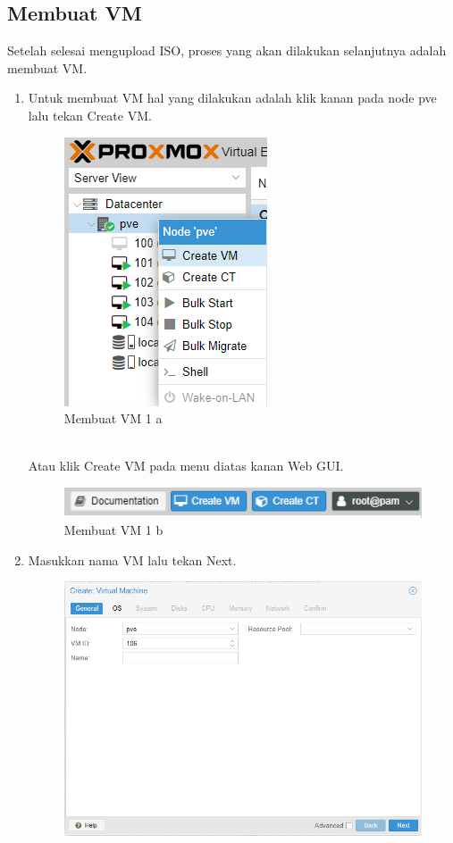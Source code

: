 \documentclass{article}
\begin{document}
  \subsection{Membuat VM}
  Setelah selesai mengupload ISO, proses yang akan dilakukan selanjutnya adalah membuat VM.
  \begin{enumerate}
  \item Untuk membuat VM hal yang dilakukan adalah klik kanan pada node pve lalu tekan Create VM.
  \begin{figure}[h!]
    \centering
    \includegraphics[width=0.7\linewidth]{create vm 1 a.png}
    \caption{Membuat VM 1 a}
  \end{figure}
  \\ Atau klik Create VM pada menu diatas kanan Web GUI.
  \begin{figure}[h!]
    \centering
    \includegraphics[width=0.7\linewidth]{create vm 1 b.png}
    \caption{Membuat VM 1 b}
  \end{figure}
  \newpage
  \item Masukkan nama VM lalu tekan Next.
  \begin{figure}[h!]
    \centering
    \includegraphics[width=0.7\linewidth]{create vm 2 a.png}

\end{figure}
\end{enumerate}
\end{document}
